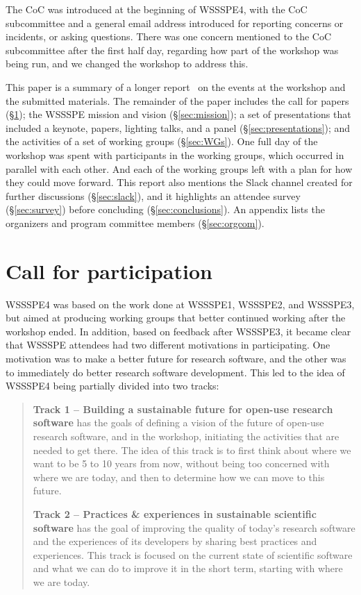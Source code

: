 \documentclass[11pt, oneside]{amsart}
\begin{document}
The CoC was introduced at the beginning of WSSSPE4, with the CoC subcommittee
and a general email address introduced for reporting concerns or incidents, or
asking questions.  There was one concern mentioned to the CoC subcommittee
after the first half day,
regarding how part of the workshop was being run, and we changed the workshop
to address this.

This paper is a summary of a longer report~\cite{WSSSPE4-report} on the events at the workshop and the submitted materials.
The remainder of the paper includes the call for papers (\S\ref{sec:preworkshop}); the WSSSPE mission and vision (\S\ref{sec:mission}); a set of presentations that included a keynote, papers, lighting talks, and a panel (\S\ref{sec:presentations}); and the activities of a set of working groups (\S\ref{sec:WGs}).  One full day of the
workshop was spent with participants in the working groups, which occurred in parallel
with each other.  And each of the working groups left with a plan for how they could move
forward.
This report also mentions the Slack channel created for further discussions (\S\ref{sec:slack}), and it highlights an attendee survey (\S\ref{sec:survey}) before concluding (\S\ref{sec:conclusions}).
An appendix lists the organizers and program committee members (\S\ref{sec:orgcom}).



\section{Call for participation} \label{sec:preworkshop}

WSSSPE4 was based on the work done at WSSSPE1, WSSSPE2, and WSSSPE3, but aimed
at producing working groups that better continued working after the workshop ended.
In addition, based on feedback after WSSSPE3, it became clear that WSSSPE attendees
had two different motivations in participating.  One motivation was to make a better future
for research software, and the other was to immediately do better research software development.
This led to the idea of WSSSPE4 being partially divided into two tracks:

\begin{quote}
    \textbf{Track 1 -- Building a sustainable future for open-use research
    software} has the goals of defining a vision of the future of open-use
    research software, and in the workshop, initiating the activities that are
    needed to get there. The idea of this track is to first think about where
    we want to be 5 to 10 years from now, without being too concerned with
    where we are today, and then to determine how we can move to this future.

    \noindent \textbf{Track 2 -- Practices \& experiences in sustainable scientific software}
    has the goal of improving the quality of today's research software and the
    experiences of its developers by sharing best practices and experiences.
    This track is focused on the current state of scientific software and what
    we can do to improve it in the short term, starting with where we are today.
\end{quote}
\end{document}

